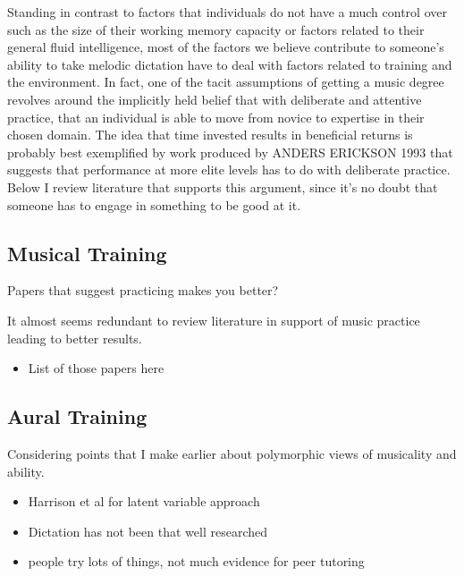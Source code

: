 \documentclass[]{book}
\providecommand{\tightlist}{%
  \setlength{\itemsep}{0pt}\setlength{\parskip}{0pt}}
\theoremstyle{definition}
\theoremstyle{definition}
\theoremstyle{definition}
\theoremstyle{remark}
\begin{document}
Standing in contrast to factors that individuals do not have a much
control over such as the size of their working memory capacity or
factors related to their general fluid intelligence, most of the factors
we believe contribute to someone's ability to take melodic dictation
have to deal with factors related to training and the environment. In
fact, one of the tacit assumptions of getting a music degree revolves
around the implicitly held belief that with deliberate and attentive
practice, that an individual is able to move from novice to expertise in
their chosen domain. The idea that time invested results in beneficial
returns is probably best exemplified by work produced by ANDERS ERICKSON
1993 that suggests that performance at more elite levels has to do with
deliberate practice. Below I review literature that supports this
argument, since it's no doubt that someone has to engage in something to
be good at it.

\hypertarget{musical-training}{%
\subsection{Musical Training}\label{musical-training}}

Papers that suggest practicing makes you better?

It almost seems redundant to review literature in support of music
practice leading to better results.

\begin{itemize}
\tightlist
\item
  List of those papers here
\end{itemize}

\hypertarget{aural-training}{%
\subsection{Aural Training}\label{aural-training}}

Considering points that I make earlier about polymorphic views of
musicality and ability.

\begin{itemize}
\item
  Harrison et al for latent variable approach
  \citep{harrisonEffectsMusicalAptitude1994}
\item
  Dictation has not been that well researched
  \citep{furbyEffectsPeerTutoring2016}
\item
  people try lots of things, not much evidence for peer tutoring
  \citep{furbyEffectsPeerTutoring2016}
\end{itemize}
\end{document}
